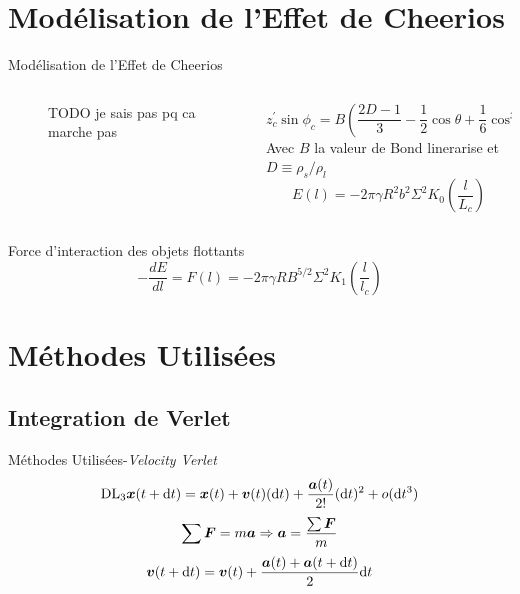 \documentclass[aspectratio=169,xcolor=dvipsnames]{beamer}
\begin{document}
\section{Modélisation de l'Effet de Cheerios}
\begin{frame}{Modélisation de l'Effet de Cheerios\cite{vella_cheerios_2005}}
    \begin{columns}
        \begin{column}[]{0.3\textwidth}
            \begin{figure}
                \centering
                TODO je sais pas pq ca marche pas 
            \end{figure}
        \end{column}
        \begin{column}[]{0.6\textwidth}
            \[z_c^{'}\sin \phi_c = B\left(\frac{2D-1}{3}-\frac{1}{2}\cos \theta + \frac{1}{6} \cos^3 \theta\right) \equiv B\Sigma\]
            Avec $B$ la valeur de Bond linerarise et $D \equiv \rho_s / \rho_l$
            \[E(l)=-2\pi\gamma R^2b^2\Sigma^2K_0\left(\frac{l}{L_c}\right)\]
        \end{column}
    \end{columns}
    \begin{block}{Force d'interaction des objets flottants}
        \[-\frac{dE}{dl} = F(l)=-2\pi\gamma RB^{5/2}\Sigma^2K_1\left(\frac{l}{l_c}\right)\]
    \end{block}
\end{frame}

\section{Méthodes Utilisées}
\subsection{Integration de Verlet}
\begin{frame}{Méthodes Utilisées-\textit{Velocity Verlet}\cite{crivelli_stormer-verlet_2008}}
    \[\mathrm{DL}_3 \vb*{x}(t+\dd t)= \vb*{x}(t)+\vb*{v}(t)(\dd t)+\frac{\vb*{a}(t)}{2!}(\dd t)^2+o(\dd t^3)\]
    \[\sum  \vb*{F} = m\vb*{a} \Rightarrow \vb*{a} = \frac{\sum \vb*{F}}{m}\]
    \[\vb*{v}(t+\dd t) = \vb*{v}(t)+\frac{\vb*{a}(t)+\vb*{a}(t+\dd t)}{2}\dd t \]
\end{frame}
\end{document}

